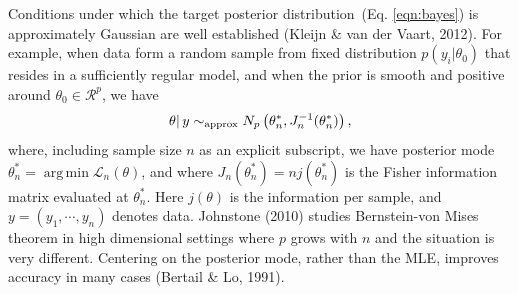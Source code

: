 \documentclass[12pt]{TD-CJS}
\newcommand{\R}{\mathcal{R}}
\DeclareMathOperator*{\argmin}{arg\,min}
\begin{document}
Conditions under which the target posterior distribution~(Eq. \ref{eqn:bayes}) is approximately Gaussian are well established (Kleijn \&  van der Vaart, 2012).  For example, when data form a random sample from fixed distribution $p(y_i|\theta_0)$
that resides in a sufficiently regular model, and when the prior is smooth and positive around $\theta_0 \in \R^p$,  we have 
\begin{eqnarray}
\label{eq:postG}
\left. \theta \right| y  \sim_{\rm approx} N_p \left( \theta_n^*, J_n^{-1}(\theta^*_n)\right),
\end{eqnarray}
where, including sample size $n$ as an explicit subscript, we have posterior mode $\theta_n^* = \argmin {\mathcal L}_n( \theta)$, and
where $J_n(\theta^*_n)=nj(\theta_n^*)$ is the Fisher information matrix evaluated at $\theta_n^*$.  
Here $j(\theta)$ is the information per sample, and $y=(y_1, \cdots, y_n)$ denotes data. Johnstone (2010) studies Bernstein-von Mises theorem in high dimensional settings where $p$ grows with $n$ and the situation is very different. 
Centering on the posterior mode, rather than the MLE, improves accuracy in many cases (Bertail \& Lo, 1991).   
\end{document}
